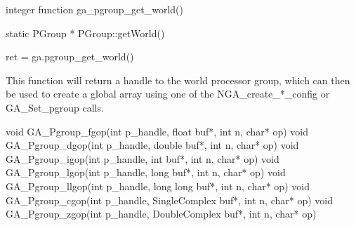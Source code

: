 \documentclass[12pt]{article}
\begin{document}
\begin{fapi}
\begin{fcode}
integer function ga_pgroup_get_world()
\end{fcode}
\end{fapi}

\begin{cxxapi}
\begin{cxxcode}
static PGroup * PGroup::getWorld()
\end{cxxcode}
\end{cxxapi}

\begin{pyapi}
\begin{pycode}
ret = ga.pgroup_get_world()
\end{pycode}
\end{pyapi}

\local

\begin{desc}
This function will return a handle to the world processor group, which can then
be used to create a global array using one of the NGA_create_*_config or
GA_Set_pgroup calls.
\end{desc}


\begin{capi}
\begin{ccode}
void GA_Pgroup_fgop(int p_handle, float buf*, int n, char* op)
void GA_Pgroup_dgop(int p_handle, double buf*, int n, char* op)
void GA_Pgroup_igop(int p_handle, int buf*, int n, char* op)
void GA_Pgroup_lgop(int p_handle, long buf*, int n, char* op)
void GA_Pgroup_llgop(int p_handle, long long buf*, int n, char* op)
void GA_Pgroup_cgop(int p_handle, SingleComplex buf*, int n, char* op)
void GA_Pgroup_zgop(int p_handle, DoubleComplex buf*, int n, char* op)
\end{ccode}
\begin{funcargs}
\end{funcargs}
\end{capi}
\end{document}
